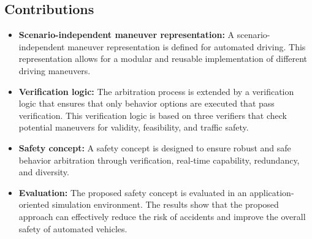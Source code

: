\subsection{Contributions}

\begin{itemize}
    \item \textbf{Scenario-independent maneuver representation:} A scenario-independent maneuver representation is defined for automated driving. This representation allows for a modular and reusable implementation of different driving maneuvers.
    \item \textbf{Verification logic:} The arbitration process is extended by a verification logic that ensures that only behavior options are executed that pass verification. This verification logic is based on three verifiers that check potential maneuvers for validity, feasibility, and traffic safety.
    \item \textbf{Safety concept:} A safety concept is designed to ensure robust and safe behavior arbitration through verification, real-time capability, redundancy, and diversity.
    \item \textbf{Evaluation:} The proposed safety concept is evaluated in an application-oriented simulation environment. The results show that the proposed approach can effectively reduce the risk of accidents and improve the overall safety of automated vehicles.
\end{itemize}
